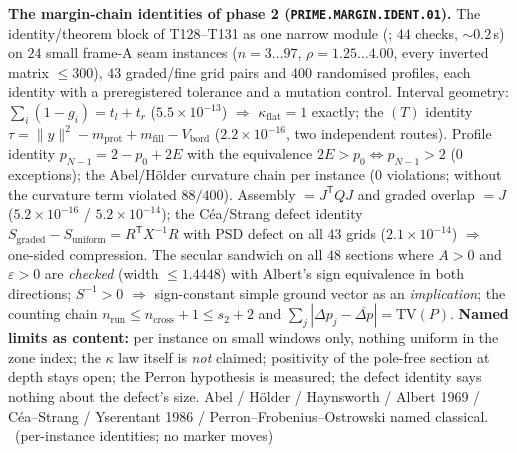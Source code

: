 \par\smallskip\noindent\textbf{The margin-chain identities of phase 2
(\texttt{PRIME.MARGIN.IDENT.01}).}
The identity/theorem block of T128--T131 as one narrow module
(; $44$ checks, ${\sim}0.2$\,s) on $24$
small frame-A seam instances ($n=3\ldots97$, $\rho=1.25\ldots4.00$, every
inverted matrix $\le300$), $43$ graded/fine grid pairs and $400$ randomised
profiles, each identity with a preregistered tolerance and a mutation control.
Interval geometry: $\sum_i(1-g_i)=t_l+t_r$ ($5.5\times10^{-13}$) $\Rightarrow$
$\kappa_{\mathrm{flat}}=1$ exactly; the $(T)$ identity
$\tau=\|y\|^2-m_{\mathrm{prot}}+m_{\mathrm{fill}}-V_{\mathrm{bord}}$
($2.2\times10^{-16}$, two independent routes). Profile identity
$p_{N-1}=2-p_0+2E$ with the equivalence $2E>p_0\iff p_{N-1}>2$ ($0$ exceptions);
the Abel/H\"older curvature chain per instance ($0$ violations; without the
curvature term violated $88/400$). Assembly $=J^{\mathsf T}QJ$ and graded
overlap $=J$ ($5.2\times10^{-16}$ / $5.2\times10^{-14}$); the C\'ea/Strang
defect identity
$S_{\mathrm{graded}}-S_{\mathrm{uniform}}=R^{\mathsf T}X^{-1}R$ with PSD defect
on all $43$ grids ($2.1\times10^{-14}$) $\Rightarrow$ one-sided compression.
The secular sandwich on all $48$ sections where $A>0$ and $\varepsilon>0$ are
\emph{checked} (width $\le1.4448$) with Albert's sign equivalence in both
directions; $S^{-1}>0$ $\Rightarrow$ sign-constant simple ground vector as an
\emph{implication}; the counting chain
$n_{\mathrm{run}}\le n_{\mathrm{cross}}+1\le s_2+2$ and
$\sum_j|\Delta p_j-\overline{\Delta p}|=\mathrm{TV}(P)$.
\textbf{Named limits as content:} per instance on small windows only, nothing
uniform in the zone index; the $\kappa$ law itself is \emph{not} claimed;
positivity of the pole-free section at depth stays open; the Perron hypothesis is
measured; the defect identity says nothing about the defect's size.
Abel / H\"older / Haynsworth / Albert 1969 / C\'ea--Strang / Yserentant 1986 /
Perron--Frobenius--Ostrowski named classical.
\mE\ (per-instance identities; no marker moves)
\par\smallskip


